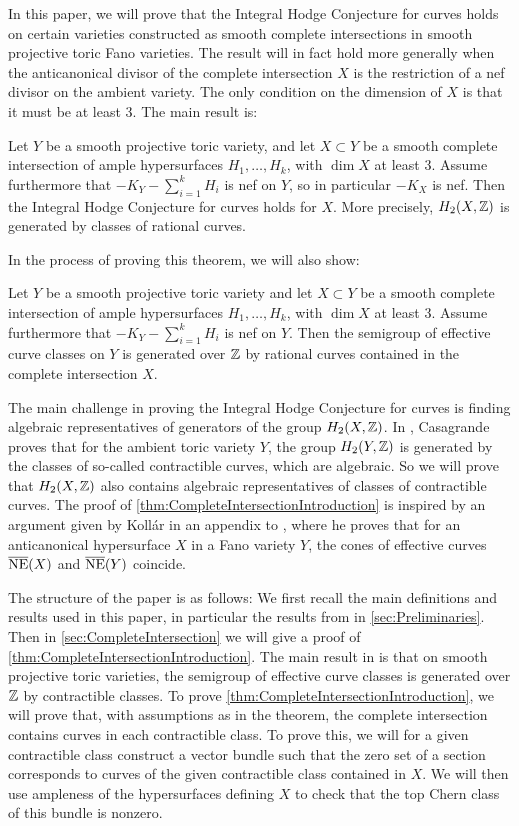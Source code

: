 In this paper, we will prove that the Integral Hodge Conjecture for curves holds on certain \CY varieties constructed as smooth complete intersections in smooth projective toric Fano varieties. The result will in fact hold more generally when the anticanonical divisor of the complete intersection $X$ is the restriction of a nef divisor on the ambient variety.
The only condition on the dimension of $X$ is that it must be at least 3. The main result is:
\begin{theorem}
	\label{thm:CompleteIntersectionIntroduction}
	Let $Y$ be a smooth projective toric variety, and let $X \subset Y$ be a smooth complete intersection of ample hypersurfaces $H_1,\dots,H_k$, with $\dim X$ at least 3. Assume furthermore that $-K_Y - \sum_{i=1}^k H_i$ is nef on $Y$, so in particular $-K_X$ is nef. Then the Integral Hodge Conjecture for curves holds for $X$. More precisely, $H_2(X,\mathbb{Z})$ is generated by classes of rational curves.
\end{theorem}
In the process of proving this theorem, we will also show:
\begin{proposition}
	\label{prop:SemigroupGenerated}
	Let $Y$ be a smooth projective toric variety and let $X \subset Y$ be a smooth complete intersection of ample hypersurfaces $H_1,\dots,H_k$, with $\dim X$ at least 3. Assume furthermore that $-K_Y - \sum_{i=1}^k H_i$ is nef on $Y$. Then the semigroup of effective curve classes on $Y$ is generated over $\mathbb{Z}$ by rational curves contained in the complete intersection $X$.
\end{proposition}

The main challenge in proving the Integral Hodge Conjecture for curves is finding algebraic representatives of generators of the group $H_2(X,\mathbb{Z})$. In \cite{Casagrande}, Casagrande proves that for the ambient toric variety $Y$, the group $H_2(Y,\mathbb{Z})$ is generated by the classes of so-called contractible curves, which are algebraic. So we will prove that $H_2(X,\mathbb{Z})$ also contains algebraic representatives of classes of contractible curves. The proof of \cref{thm:CompleteIntersectionIntroduction} is inspired by an argument given by Koll\'ar in an appendix to \cite{Bor91}, where he proves that for an anticanonical hypersurface $X$ in a Fano variety $Y$, the cones of effective curves $\overline{\text{NE}}(X)$ and $\overline{\text{NE}}(Y)$ coincide.

The structure of the paper is as follows: We first recall the main definitions and results used in this paper, in particular the results from \cite{Casagrande} in \cref{sec:Preliminaries}. Then in \cref{sec:CompleteIntersection} we will give a proof of \cref{thm:CompleteIntersectionIntroduction}. 
The main result in \cite{Casagrande} is that on smooth projective toric varieties, the semigroup of effective curve classes is generated over $\mathbb{Z}$ by contractible classes. To prove \cref{thm:CompleteIntersectionIntroduction}, we will prove that, with assumptions as in the theorem, the complete intersection contains curves in each contractible class. To prove this, we will for a given contractible class construct a vector bundle such that the zero set of a section corresponds to curves of the given contractible class contained in $X$. We will then use ampleness of the hypersurfaces defining $X$ to check that the top Chern class of this bundle is nonzero.

